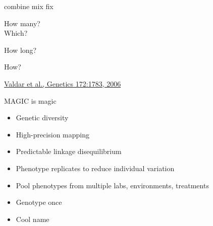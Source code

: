 \documentclass[12pt]{article}
\newcommand{\headsize}{\fontsize{35}{35} \selectfont}
\newcommand{\smallsize}{\fontsize{25}{30} \selectfont}
\newcommand{\smallersize}{\fontsize{20}{25} \selectfont}
\newcommand{\citesize}{\fontsize{14}{18} \selectfont}
\begin{document}
\smallsize \color{myyellow}
\hspace*{52mm} combine \hspace*{35mm} mix \hspace*{52mm} fix

\smallersize
\color{mywhite}
\vspace{20pt}

\hspace*{6mm}
\begin{minipage}[t]{45mm}
\vspace*{0mm}
\centering

How many? \\[20pt]
Which?
\end{minipage}
\hspace{57mm}
\begin{minipage}[t]{45mm}
\vspace*{0mm}
\centering

How long?
\end{minipage}
\hspace{18mm}
\begin{minipage}[t]{45mm}
\vspace*{0mm}
\centering

How?
\end{minipage}


\vfill

\hfill {\citesize \color{citecolor} \href{http://www.genetics.org/content/172/3/1783.full}{Valdar et al., Genetics 172:1783, 2006}}

\vspace*{5mm}



\newpage

\headsize \color{myyellow}
\hfill \begin{minipage}{5.75in}
\centering
MAGIC is magic
\end{minipage}

\vspace{25mm}

\color{mywhite}
\smallsize

\hfill \begin{minipage}{10in}
\begin{itemize}
\itemsep24pt
\item Genetic diversity

\item High-precision mapping

\item Predictable linkage disequilibrium

\item Phenotype replicates to reduce individual variation

\item Pool phenotypes from multiple labs, environments, treatments

\item Genotype once

\color{mybgcolor}
\item Cool name

\end{itemize}
\end{minipage}
\end{document}
